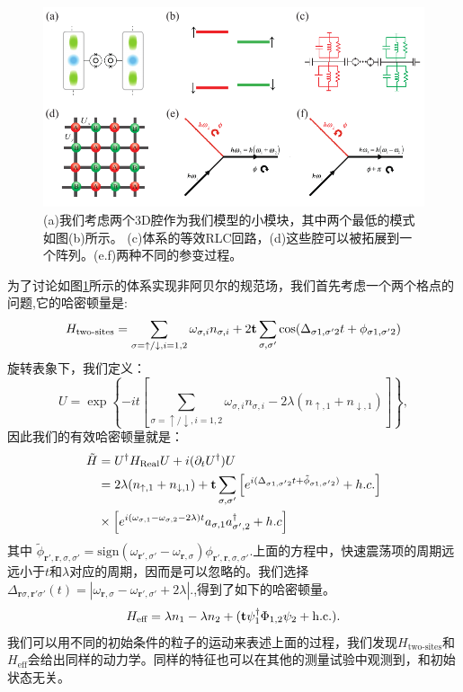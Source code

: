 \documentclass[supercite]{HustGraduPaper}
\def\r{\mathbf{r}}
\begin{document}
\begin{figure}
	\centering
	\includegraphics[width=1\linewidth]{Figures/topoinsu/S7}
	\caption{(a)我们考虑两个3D腔作为我们模型的小模块\cite{Paik2011,Girvin2013,reagor2013reaching}，其中两个最低的模式如图(b)所示。 (c)体系的等效RLC回路，(d)这些腔可以被拓展到一个阵列。(e.f)两种不同的参变过程。}
	\label{fig:s7}
\end{figure}
为了讨论如图\ref{fig:s7}所示的体系实现非阿贝尔的规范场\cite{Goldman2009}，我们首先考虑一个两个格点的问题,它的哈密顿量是\cite{Zakka-bajjani2011}:
\begin{equation}
H_\text{two-sites} = \sum_{\sigma = \uparrow / \downarrow , i = 1,2}\omega_{\sigma,i} n_{\sigma,i} + 2{\bf{t}} \sum_{\sigma, \sigma'} \cos(\Delta_{\sigma 1,\sigma' 2} t + \phi_{\sigma 1,\sigma' 2})
\end{equation}
旋转表象下，我们定义：
\begin{equation}
U = \exp \left\{-i t \left[ \sum_{\sigma = \uparrow / \downarrow , i = 1,2}\omega_{\sigma,i} n_{\sigma,i} -2 \lambda(n_{\uparrow,1} + n_{\downarrow,1}) \right]\right\}, 
\end{equation}
因此我们的有效哈密顿量就是：
\begin{equation}
\begin{aligned}
\tilde{H} &= U^\dagger H_{\text{Real}} U + i (\partial_t U^\dagger )U \\
&= 2 \lambda (n_{\uparrow,1} + n_{\downarrow,1}) + {\bf{t}} \sum_{\sigma, \sigma'} \left[e^{i(\Delta_{\sigma 1,\sigma' 2} t + \tilde \phi_{\sigma 1, \sigma' 2})} + h.c. \right]\\
&\times\left[ e^{i (\omega_{\sigma,1}-\omega_{\sigma,2} - 2\lambda)t} a_{\sigma,1} a^\dagger_{{\sigma',2}} + h.c\right]
\end{aligned}
\end{equation}
其中 $\tilde \phi _{\r',\r,\sigma ,\sigma '} = \text{sign} (\omega_{\r',\sigma '} - \omega_{\r,\sigma }) \phi _{\r',\r,\sigma ,\sigma '}$.上面的方程中，快速震荡项的周期远远小于$t$和$\lambda$对应的周期，因而是可以忽略的。我们选择${\Delta _{\r\sigma ,\r'\sigma '}}\left( t \right) = \left| {{\omega _{\r,\sigma }} - {\omega _{\r',\sigma '}}} +2\lambda\right|$.,得到了如下的哈密顿量。
\begin{equation}
H_{\text{eff}} = \lambda n_1  - \lambda n_2 +  ({\bf{t}} \psi^\dagger_1 \Phi_{1,2} \psi_2 + \text{h.c.}).
\end{equation}
我们可以用不同的初始条件的粒子的运动来表述上面的过程，我们发现$H_\text{two-sites}$和$H_\text{eff}$会给出同样的动力学。同样的特征也可以在其他的测量试验中观测到，和初始状态无关。
\end{document}
